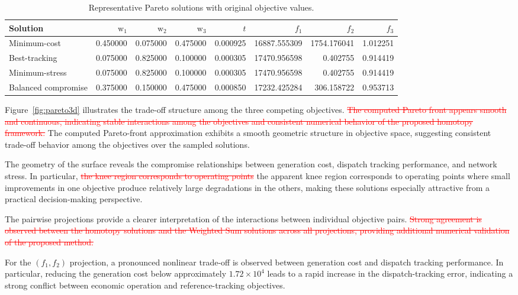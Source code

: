 \documentclass[11pt,pdflatex,sn-mathphys-ay]{sn-jnl}%
\theoremstyle{definition}
\theoremstyle{thmstyleone}%
\theoremstyle{thmstyletwo}%
\theoremstyle{thmstylethree}%
\newcommand{\del}[1]{\textcolor{red}{\sout{#1}}}
\newcommand{\add}[1]{\textcolor{revisionblue}{#1}}
\begin{document}
	\begin{table}[h!]
		\centering
		\caption{Representative Pareto solutions with original objective values.}
		\label{tab:representative-solutions}
		\begin{tabular}{lrrrrrrr}
			\toprule
			Solution & $\text{w}_1$ & $\text{w}_2$ & $\text{w}_3$ & $t$ & $f_1$ & $f_2$ & $f_3$ \\
			\midrule
			Minimum-cost & 0.450000 & 0.075000 & 0.475000 & 0.000925 & 16887.555309 & 1754.176041 & 1.012251 \\
			Best-tracking & 0.075000 & 0.825000 & 0.100000 & 0.000305 & 17470.956598 & 0.402755 & 0.914419 \\
			Minimum-stress & 0.075000 & 0.825000 & 0.100000 & 0.000305 & 17470.956598 & 0.402755 & 0.914419 \\
			Balanced compromise & 0.375000 & 0.150000 & 0.475000 & 0.000850 & 17232.425284 & 306.158722 & 0.953713 \\
			\bottomrule
		\end{tabular}
	\end{table}
	Figure~\ref{fig:pareto3d} illustrates the trade-off structure among the three competing objectives. 
	\del{The computed Pareto front appears smooth
		and continuous, indicating stable interactions
		among the objectives and consistent numerical
		behavior of the proposed homotopy framework.}
	\add{The computed Pareto-front approximation
		exhibits a smooth geometric structure in
		objective space, suggesting consistent
		trade-off behavior among the objectives
		over the sampled solutions.}
	
	The geometry of the surface reveals the compromise relationships between generation cost, dispatch tracking performance, and network stress. 
	In particular, \del{the knee region corresponds to operating points}
	\add{the apparent knee region corresponds to operating points} where small improvements in one objective produce relatively large degradations in the others, making these solutions especially attractive from a practical decision-making perspective.
	
	The pairwise projections provide a clearer interpretation
	of the interactions between individual objective pairs.
	\del{Strong agreement is observed between the homotopy solutions
		and the Weighted Sum solutions across all projections,
		providing additional numerical validation of the proposed method.}
	
	For the $(f_1,f_2)$ projection, a pronounced nonlinear trade-off is observed between generation cost and dispatch tracking performance. 
	In particular, reducing the generation cost below approximately $1.72\times10^4$ leads to a rapid increase in the dispatch-tracking error, indicating a strong conflict between economic operation and reference-tracking objectives.
	
\end{document}
